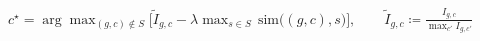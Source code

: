 \documentclass[preview,border=3pt,12pt,varwidth=60cm]{standalone}
\begin{document}
\Large $\displaystyle c^\star = \arg\max_{(g,c)\notin S}\Big[\tilde{I}_{g,c} - \lambda \max_{s\in S}\,\mathrm{sim}\big((g,c),s\big)\Big], \qquad \tilde{I}_{g,c} \coloneqq \frac{I_{g,c}}{\max_{c'} I_{g,c'}}$
\end{document}
